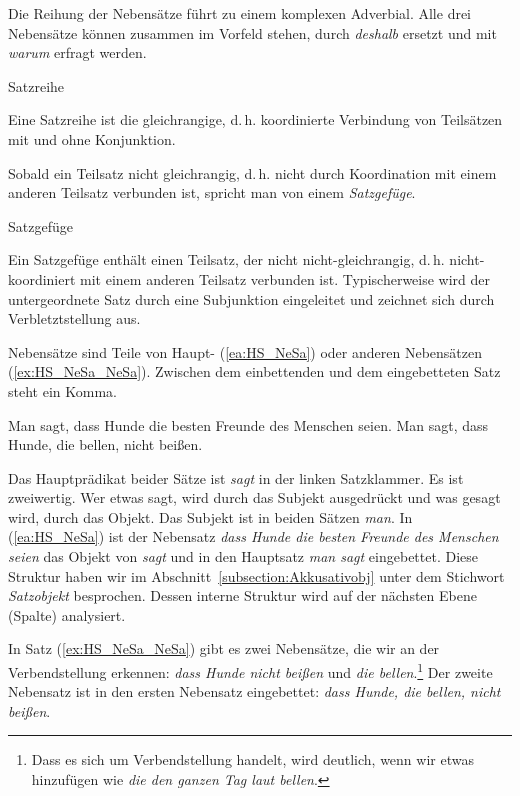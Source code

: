 Die Reihung der Nebensätze führt zu einem komplexen Adverbial. Alle drei Nebensätze können zusammen im Vorfeld stehen, durch \textit{deshalb} ersetzt und mit \textit{warum} erfragt werden.

\begin{Definition}{Satzreihe}
    
\noindent 
Eine Satzreihe ist die gleichrangige, d.\,h. koordinierte Verbindung von Teilsätzen mit und ohne Konjunktion.  
\end{Definition}



Sobald ein Teilsatz nicht gleichrangig, d.\,h. nicht durch Koordination mit einem anderen Teilsatz verbunden ist, spricht man von einem \textit{Satzgefüge}. 

\newpage
\begin{Definition}{Satzgefüge}
    
\noindent 
Ein Satzgefüge enthält einen Teilsatz, der nicht nicht-gleichrangig, d.\,h. nicht-koordiniert mit einem anderen Teilsatz verbunden ist. Typischerweise wird der untergeordnete Satz durch eine Subjunktion eingeleitet und zeichnet sich durch Verbletztstellung aus. 
\end{Definition}



Nebensätze sind Teile von Haupt- (\ref{ea:HS_NeSa}) oder anderen Nebensätzen (\ref{ex:HS_NeSa_NeSa}). Zwischen dem einbettenden und dem eingebetteten Satz steht ein Komma.  

\ea \label{ea:Satzgefüge}
\ea \label{ea:HS_NeSa} Man sagt, dass Hunde die besten Freunde des Menschen seien. 
\ex \label{ex:HS_NeSa_NeSa} Man sagt, dass Hunde, die bellen, nicht beißen.
\z 
\z 

Das Hauptprädikat beider Sätze ist \textit{sagt} in der linken Satzklammer. Es ist zweiwertig. Wer etwas sagt, wird durch das Subjekt ausgedrückt und was gesagt wird, durch das Objekt. Das Subjekt ist in beiden Sätzen \textit{man}. In (\ref{ea:HS_NeSa}) ist der Nebensatz \textit{dass Hunde die besten Freunde des Menschen seien} das Objekt von \textit{sagt} und in den Hauptsatz \textit{man sagt} eingebettet. Diese Struktur haben wir im Abschnitt~\ref{subsection:Akkusativobj} unter dem Stichwort \textit{Satzobjekt} besprochen. Dessen interne Struktur wird auf der nächsten Ebene (Spalte) analysiert.

In Satz (\ref{ex:HS_NeSa_NeSa}) gibt es zwei Nebensätze, die wir an der Verbendstellung erkennen: \textit{dass Hunde nicht beißen} und \textit{die bellen}.\footnote{Dass es sich um Verbendstellung handelt, wird deutlich, wenn wir etwas hinzufügen wie \textit{die den ganzen Tag laut bellen}.} Der zweite Nebensatz ist in den ersten Nebensatz eingebettet: \textit{dass Hunde, die bellen, nicht beißen}. 

